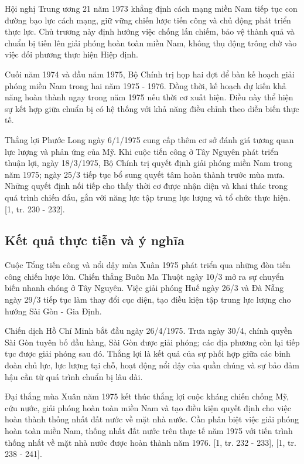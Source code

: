 Hội nghị Trung ương 21 năm 1973 khẳng định cách mạng miền Nam tiếp tục con đường bạo lực cách mạng, giữ vững chiến lược tiến công và chủ động phát triển thực lực. Chủ trương này định hướng việc chống lấn chiếm, bảo vệ thành quả và chuẩn bị tiến lên giải phóng hoàn toàn miền Nam, không thụ động trông chờ vào việc đối phương thực hiện Hiệp định.

Cuối năm 1974 và đầu năm 1975, Bộ Chính trị họp hai đợt để bàn kế hoạch giải phóng miền Nam trong hai năm 1975 - 1976. Đồng thời, kế hoạch dự kiến khả năng hoàn thành ngay trong năm 1975 nếu thời cơ xuất hiện. Điều này thể hiện sự kết hợp giữa chuẩn bị có hệ thống với khả năng điều chỉnh theo diễn biến thực tế.

Thắng lợi Phước Long ngày 6/1/1975 cung cấp thêm cơ sở đánh giá tương quan lực lượng và phản ứng của Mỹ. Khi cuộc tiến công ở Tây Nguyên phát triển thuận lợi, ngày 18/3/1975, Bộ Chính trị quyết định giải phóng miền Nam trong năm 1975; ngày 25/3 tiếp tục bổ sung quyết tâm hoàn thành trước mùa mưa. Những quyết định nối tiếp cho thấy thời cơ được nhận diện và khai thác trong quá trình chiến đấu, gắn với năng lực tập trung lực lượng và tổ chức thực hiện. [1, tr. 230 - 232].

\subsection{Kết quả thực tiễn và ý nghĩa}

Cuộc Tổng tiến công và nổi dậy mùa Xuân 1975 phát triển qua những đòn tiến công chiến lược lớn. Chiến thắng Buôn Ma Thuột ngày 10/3 mở ra sự chuyển biến nhanh chóng ở Tây Nguyên. Việc giải phóng Huế ngày 26/3 và Đà Nẵng ngày 29/3 tiếp tục làm thay đổi cục diện, tạo điều kiện tập trung lực lượng cho hướng Sài Gòn - Gia Định.

Chiến dịch Hồ Chí Minh bắt đầu ngày 26/4/1975. Trưa ngày 30/4, chính quyền Sài Gòn tuyên bố đầu hàng, Sài Gòn được giải phóng; các địa phương còn lại tiếp tục được giải phóng sau đó. Thắng lợi là kết quả của sự phối hợp giữa các binh đoàn chủ lực, lực lượng tại chỗ, hoạt động nổi dậy của quần chúng và sự bảo đảm hậu cần từ quá trình chuẩn bị lâu dài.

Đại thắng mùa Xuân năm 1975 kết thúc thắng lợi cuộc kháng chiến chống Mỹ, cứu nước, giải phóng hoàn toàn miền Nam và tạo điều kiện quyết định cho việc hoàn thành thống nhất đất nước về mặt nhà nước. Cần phân biệt việc giải phóng hoàn toàn miền Nam, thống nhất đất nước trên thực tế năm 1975 với tiến trình thống nhất về mặt nhà nước được hoàn thành năm 1976. [1, tr. 232 - 233], [1, tr. 238 - 241].

